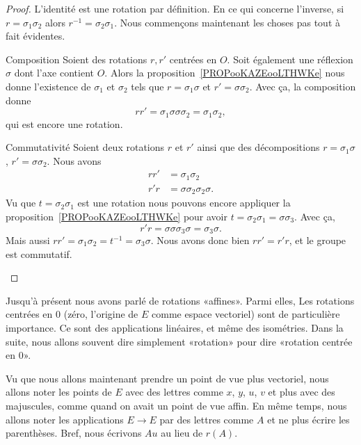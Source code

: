 \begin{proof}
    L'identité est une rotation par définition. En ce qui concerne l'inverse, si \( r=\sigma_1\sigma_2\) alors \( r^{-1}=\sigma_2\sigma_1\). Nous commençons maintenant les choses pas tout à fait évidentes.
    \begin{subproof}
        \item[Composition]
            Soient des rotations \( r,r'\) centrées en \( O\). Soit également une réflexion \( \sigma\) dont l'axe contient \( O\). Alors la proposition~\ref{PROPooKAZEooLTHWKe} nous donne l'existence de \( \sigma_1\) et \( \sigma_2\) tels que \( r=\sigma_1\sigma\) et \( r'=\sigma\sigma_2\). Avec ça, la composition donne
            \begin{equation}
                rr'=\sigma_1\sigma\sigma\sigma_2=\sigma_1\sigma_2,
            \end{equation}
            qui est encore une rotation.
        \item[Commutativité]
            Soient deux rotations \( r\) et \( r'\) ainsi que des décompositions \( r=\sigma_1\sigma\), \( r'=\sigma\sigma_2\). Nous avons
            \begin{subequations}
                \begin{align}
                    rr'&=\sigma_1\sigma_2\\
                    r'r&=\sigma\sigma_2\sigma_2\sigma.
                \end{align}
            \end{subequations}
            Vu que \( t=\sigma_2\sigma_1\) est une rotation nous pouvons encore appliquer la proposition~\ref{PROPooKAZEooLTHWKe} pour avoir \( t=\sigma_2\sigma_1=\sigma\sigma_3\). Avec ça,
            \begin{equation}
                r'r=\sigma\sigma\sigma_3\sigma=\sigma_3\sigma.
            \end{equation}
            Mais aussi \( rr'=\sigma_1\sigma_2=t^{-1}=\sigma_3\sigma\). Nous avons donc bien \( rr'=r'r\), et le groupe est commutatif.
    \end{subproof}
\end{proof}

\begin{normaltext}      \label{NORMooOUDJooRfbDEX}
    Jusqu'à présent nous avons parlé de rotations «affines». Parmi elles, Les rotations centrées en \( 0\) (zéro, l'origine de \( E\) comme espace vectoriel) sont de particulière importance. Ce sont des applications linéaires, et même des isométries. Dans la suite, nous allons souvent dire simplement «rotation» pour dire «rotation centrée en \( 0\)».

    Vu que nous allons maintenant prendre un point de vue plus vectoriel, nous allons noter les points de \( E\) avec des lettres comme \( x\), \( y\), \( u\), \( v\) et plus avec des majuscules, comme quand on avait un point de vue affin. En même temps, nous allons noter les applications \( E\to E \) par des lettres comme \( A\) et ne plus écrire les parenthèses. Bref, nous écrivons \( Au\) au lieu de \( r(A)\).
\end{normaltext}

